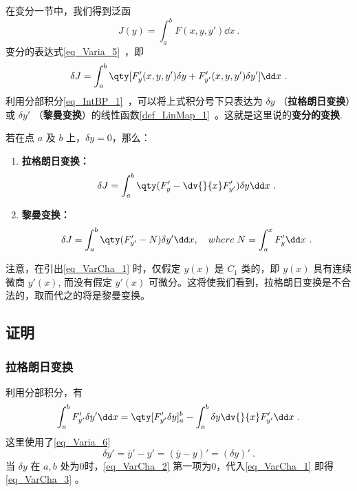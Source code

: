 
在变分一节中，我们得到泛函 
\begin{equation}
J(y)=\int_a^bF(x,y,y')\dd x~.
\end{equation}
变分的表达式\autoref{eq_Varia_5}~，即
\begin{equation}\label{eq_VarCha_1}
\delta J=\int_a^b\qty[F'_y(x,y,y')\delta y+F'_{y'}(x,y,y')\delta y']\dd x~.
\end{equation}
利用分部积分\autoref{eq_IntBP_1}~，可以将上式积分号下只表达为 $\delta y$ （\textbf{拉格朗日变换}）或 $\delta y'$ （\textbf{黎曼变换}）的线性函数\autoref{def_LinMap_1}~。这就是这里说的\textbf{变分的变换}.

若在点 $a$ 及 $b$ 上，$\delta y=0$，那么：
\begin{enumerate}
\item \textbf{拉格朗日变换：}
\begin{equation}\label{eq_VarCha_3}
\delta J=\int_a^b\qty(F'_y-\dv{}{x}F'_{y'})\delta y\dd x~.
\end{equation}
\item \textbf{黎曼变换：}
\begin{equation}\label{eq_VarCha_4}
\delta J=\int_a^b\qty(F'_{y'}-N)\delta y'\dd x ,\quad where \;N=\int_a^xF'_y\dd x~.
\end{equation}
\end{enumerate}


注意，在引出\autoref{eq_VarCha_1} 时，仅假定 $y(x)$ 是 $C_1$ 类的，即 $y(x)$ 具有连续微商 $y'(x)$, 而没有假定 $y'(x)$ 可微分。这将使我们看到，拉格朗日变换是不合法的，取而代之的将是黎曼变换。 

\subsection{证明}
\subsubsection{拉格朗日变换}
利用分部积分，有
\begin{equation}\label{eq_VarCha_2}
\int_a^bF'_{y'}\delta y'\dd x=\qty[F'_{y'}\delta y]_a^b-\int_a^b\delta y\dv{}{x}F'_{y'}\dd x~.
\end{equation}
这里使用了\autoref{eq_Varia_6}~
\begin{equation}\label{eq_VarCha_5}
\delta y'=\overline{y}'-y'=(\overline{y}-y)'=(\delta y)'~.
\end{equation}
当 $\delta y$ 在 $a,b$ 处为0时，\autoref{eq_VarCha_2} 第一项为0，代入\autoref{eq_VarCha_1} 即得\autoref{eq_VarCha_3} 。

